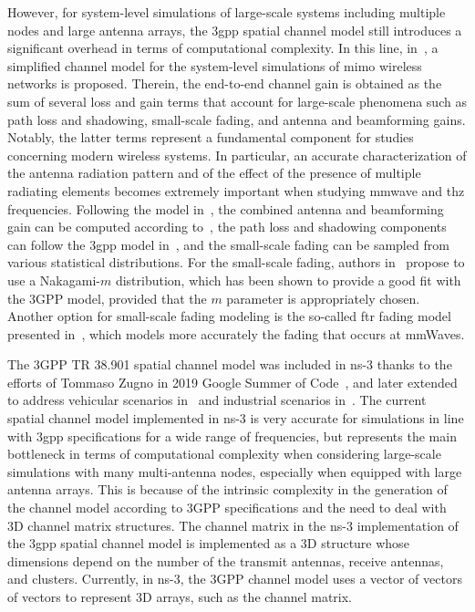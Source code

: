 However, for system-level simulations of large-scale systems including multiple nodes and large antenna arrays, the \gls{3gpp} spatial channel model still introduces a significant overhead in terms of computational complexity. In this line, in~\cite{8445856}, a simplified channel model for the system-level simulations of \gls{mimo} wireless networks is proposed. Therein, the end-to-end channel gain is obtained as the sum of several loss and gain terms that account for large-scale phenomena such as path loss and shadowing, small-scale fading, and antenna and beamforming gains. Notably, the latter terms represent a fundamental component for studies concerning modern wireless systems. In particular, an accurate characterization of the antenna radiation pattern and of the effect of the presence of multiple radiating elements becomes extremely important when studying \gls{mmwave} and \gls{thz} frequencies. Following the model in~\cite{8445856}, the combined antenna and beamforming gain can be computed according to~\cite{8422746}, the path loss and shadowing components can follow the \gls{3gpp} model in~\cite{TR38901}, and the small-scale fading can be sampled from various statistical distributions. 
For the small-scale fading, authors in~\cite{8445856} propose to use a Nakagami-$m$ distribution, which has been shown to provide a good fit with the 3GPP model, provided that the $m$ parameter is appropriately chosen.
Another option for small-scale fading modeling is the so-called \gls{ftr} fading model presented in~\cite{7917287}, which models more accurately the fading that occurs at mmWaves.

The 3GPP TR 38.901 spatial channel model was included in ns-3 thanks to the efforts of Tommaso Zugno in 2019 Google Summer of Code~\cite{tommaso:20}, and later extended to address vehicular scenarios in~\cite{10.1145/3460797.3460801} and industrial scenarios in~\cite{10.1145/3532577.3532596}. The current spatial channel model implemented in ns-3 is very accurate for simulations in line with \gls{3gpp} specifications for a wide range of frequencies, but represents the main bottleneck in terms of computational complexity when considering large-scale simulations with many multi-antenna nodes, especially when equipped with large antenna arrays. This is because of the intrinsic complexity in the generation of the channel model according to 3GPP specifications and the need to deal with 3D channel matrix structures. The channel matrix in the ns-3 implementation of the \gls{3gpp} spatial channel model is implemented as a 3D structure whose dimensions depend on the number of the transmit antennas, receive antennas, and clusters. Currently, in ns-3, the 3GPP channel model uses a vector of vectors of vectors to represent 3D arrays, such as the channel matrix. 

